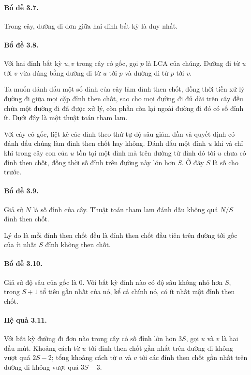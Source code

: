 \documentclass[11pt]{article}
\begin{document}
\paragraph{Bổ đề 3.7.}
Trong cây, đường đi đơn giữa hai đỉnh bất kỳ là duy nhất.

\paragraph{Bổ đề 3.8.}
Với hai đỉnh bất kỳ \(u,v\) trong cây có gốc, gọi \(p\) là LCA của chúng.
Đường đi từ \(u\) tới \(v\) vừa đúng bằng đường đi từ \(u\) tới \(p\) và
đường đi từ \(p\) tới \(v\).

Ta muốn đánh dấu một số đỉnh của cây làm đỉnh then chốt, đồng thời tiền xử
lý đường đi giữa mọi cặp đỉnh then chốt, sao cho mọi đường đi đủ dài trên
cây đều chứa một đường đi đã được xử lý, còn phần còn lại ngoài đường đi đó
có số đỉnh ít. Dưới đây là một thuật toán tham lam.

Với cây có gốc, liệt kê các đỉnh theo thứ tự độ sâu giảm dần và quyết định
có đánh dấu chúng làm đỉnh then chốt hay không. Đánh dấu một đỉnh \(u\) khi
và chỉ khi trong cây con của \(u\) tồn tại một đỉnh mà trên đường từ đỉnh đó
tới \(u\) chưa có đỉnh then chốt, đồng thời số đỉnh trên đường này lớn hơn
\(S\). Ở đây \(S\) là số cho trước.

\paragraph{Bổ đề 3.9.}
Giả sử \(N\) là số đỉnh của cây. Thuật toán tham lam đánh dấu không quá
\(N/S\) đỉnh then chốt.

Lý do là mỗi đỉnh then chốt đều là đỉnh then chốt đầu tiên trên đường tới gốc
của ít nhất \(S\) đỉnh không then chốt.

\paragraph{Bổ đề 3.10.}
Giả sử độ sâu của gốc là \(0\). Với bất kỳ đỉnh nào có độ sâu không nhỏ hơn
\(S\), trong \(S+1\) tổ tiên gần nhất của nó, kể cả chính nó, có ít nhất một
đỉnh then chốt.

\paragraph{Hệ quả 3.11.}
Với bất kỳ đường đi đơn nào trong cây có số đỉnh lớn hơn \(3S\), gọi \(u\)
và \(v\) là hai đầu mút. Khoảng cách từ \(u\) tới đỉnh then chốt gần nhất
trên đường đi không vượt quá \(2S-2\); tổng khoảng cách từ \(u\) và \(v\) tới
các đỉnh then chốt gần nhất trên đường đi không vượt quá \(3S-3\).
\end{document}
